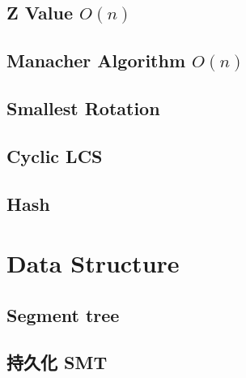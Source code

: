 \documentclass[a4paper,10pt,twocolumn,oneside]{article}
\begin{document}
\subsection{Z Value $O(n)$}


%

\subsection{Manacher Algorithm $O(n)$}


\subsection{Smallest Rotation}


%

\subsection{Cyclic LCS}


\subsection{Hash}
 


\section{Data Structure}

\subsection{Segment tree}


\subsection{持久化 SMT}

\end{document}
